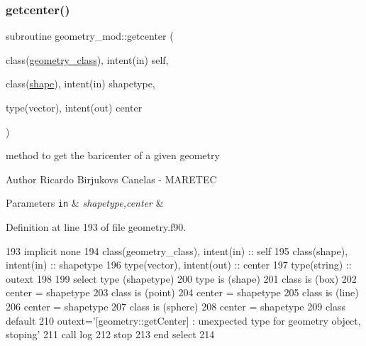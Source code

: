 \subsubsection{\texorpdfstring{getcenter()}{getcenter()}}
{\footnotesize\ttfamily subroutine geometry\+\_\+mod\+::getcenter (\begin{DoxyParamCaption}\item[{class(\mbox{\hyperlink{structgeometry__mod_1_1geometry__class}{geometry\+\_\+class}}), intent(in)}]{self,  }\item[{class(\mbox{\hyperlink{structgeometry__mod_1_1shape}{shape}}), intent(in)}]{shapetype,  }\item[{type(vector), intent(out)}]{center }\end{DoxyParamCaption})\hspace{0.3cm}{\ttfamily [private]}}



method to get the baricenter of a given geometry 

\begin{DoxyAuthor}{Author}
Ricardo Birjukovs Canelas -\/ M\+A\+R\+E\+T\+EC
\end{DoxyAuthor}

\begin{DoxyParams}[1]{Parameters}
\mbox{\tt in}  & {\em shapetype,center} & \\
\hline
\end{DoxyParams}


Definition at line 193 of file geometry.\+f90.


\begin{DoxyCode}
193     \textcolor{keywordtype}{implicit none}
194     \textcolor{keywordtype}{class}(geometry\_class), \textcolor{keywordtype}{intent(in)} :: self
195     \textcolor{keywordtype}{class}(shape), \textcolor{keywordtype}{intent(in)} :: shapetype
196     \textcolor{keywordtype}{type}(vector), \textcolor{keywordtype}{intent(out)} :: center
197     \textcolor{keywordtype}{type}(string) :: outext
198 
199     \textcolor{keywordflow}{select type} (shapetype)
200 \textcolor{keywordflow}{    type is} (shape)
201 \textcolor{keywordflow}{    class is} (box)
202         center = shapetype%
203 \textcolor{keywordflow}{    class is} (point)
204         center = shapetype%
205 \textcolor{keywordflow}{    class is} (line)
206         center = shapetype%
207 \textcolor{keywordflow}{    class is} (sphere)
208         center = shapetype%
209 \textcolor{keywordflow}{        class default}
210         outext=\textcolor{stringliteral}{'[geometry::getCenter] : unexpected type for geometry object, stoping'}
211         \textcolor{keyword}{call }log%
212         stop
213 \textcolor{keywordflow}{    end select}
214 
\end{DoxyCode}
\mbox{\label{namespacegeometry__mod_a22dd77024fce56da299445a697256155}} 
